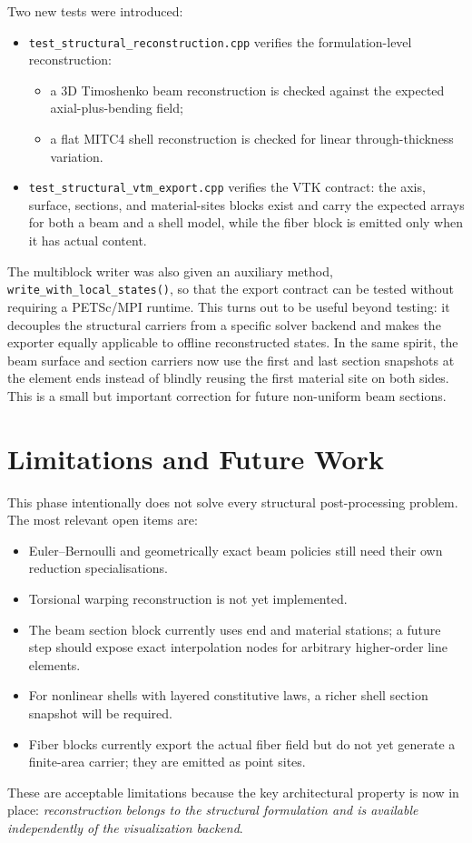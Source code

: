 Two new tests were introduced:
\begin{itemize}
  \item \texttt{test\_structural\_reconstruction.cpp} verifies the
        formulation-level reconstruction:
        \begin{itemize}
          \item a 3D Timoshenko beam reconstruction is checked against the
                expected axial-plus-bending field;
          \item a flat MITC4 shell reconstruction is checked for linear
                through-thickness variation.
        \end{itemize}
  \item \texttt{test\_structural\_vtm\_export.cpp} verifies the VTK contract:
        the axis, surface, sections, and material-sites blocks exist and carry
        the expected arrays for both a beam and a shell model, while the fiber
        block is emitted only when it has actual content.
\end{itemize}

The multiblock writer was also given an auxiliary method,
\texttt{write\_with\_local\_states()}, so that the export contract can be
tested without requiring a PETSc/MPI runtime.  This turns out to be useful
beyond testing: it decouples the structural carriers from a specific solver
backend and makes the exporter equally applicable to offline reconstructed
states.  In the same spirit, the beam surface and section carriers now use the
first and last section snapshots at the element ends instead of blindly
reusing the first material site on both sides.  This is a small but important
correction for future non-uniform beam sections.

\section{Limitations and Future Work}

This phase intentionally does not solve every structural post-processing
problem.  The most relevant open items are:
\begin{itemize}
  \item Euler--Bernoulli and geometrically exact beam policies still need their
        own reduction specialisations.
  \item Torsional warping reconstruction is not yet implemented.
  \item The beam section block currently uses end and material stations; a
        future step should expose exact interpolation nodes for arbitrary
        higher-order line elements.
  \item For nonlinear shells with layered constitutive laws, a richer shell
        section snapshot will be required.
  \item Fiber blocks currently export the actual fiber field but do not yet
        generate a finite-area carrier; they are emitted as point sites.
\end{itemize}

These are acceptable limitations because the key architectural property is now
in place: \emph{reconstruction belongs to the structural formulation and is
available independently of the visualization backend}.
